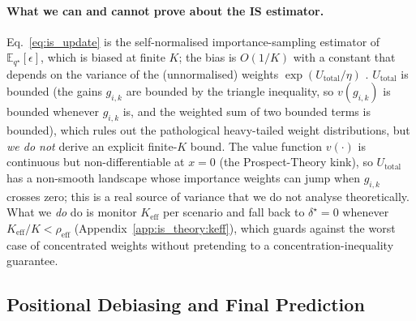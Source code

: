 \documentclass{article}
\begin{document}
\paragraph{What we can and cannot prove about the IS estimator.}
Eq.~\ref{eq:is_update} is the self-normalised importance-sampling estimator
of $\mathbb{E}_{q^{\star}}[\epsilon]$, which is biased at finite $K$; the
bias is $O(1/K)$ with a constant that depends on the variance of the
(unnormalised) weights $\exp(U_{\text{total}}/\eta)$
\citep{agapiou2017importance}. $U_{\text{total}}$ is bounded (the gains
$g_{i,k}$ are bounded by the triangle inequality, so $v(g_{i,k})$ is bounded
whenever $g_{i,k}$ is, and the weighted sum of two bounded terms is
bounded), which rules out the pathological heavy-tailed weight
distributions, but \emph{we do not} derive an explicit finite-$K$ bound.
The value function $v(\cdot)$ is continuous but non-differentiable at
$x{=}0$ (the Prospect-Theory kink), so $U_{\text{total}}$ has a
non-smooth landscape whose importance weights can jump when $g_{i,k}$
crosses zero; this is a real source of variance that we do not analyse
theoretically. What we \emph{do} do is monitor $K_{\text{eff}}$ per scenario
and fall back to $\delta^{\star}=0$ whenever $K_{\text{eff}}/K<\rho_{\text{eff}}$
(Appendix~\ref{app:is_theory:keff}), which guards against the worst case of
concentrated weights without pretending to a concentration-inequality
guarantee.

\subsection{Positional Debiasing and Final Prediction}
\label{sec:method:debias}
\end{document}
